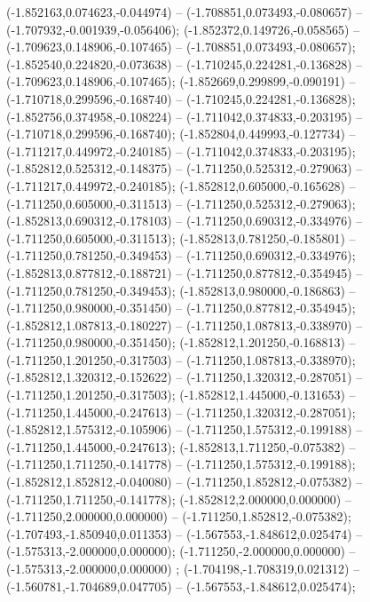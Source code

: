  (-1.852163,0.074623,-0.044974) -- (-1.708851,0.073493,-0.080657) -- (-1.707932,-0.001939,-0.056406);
 (-1.852372,0.149726,-0.058565) -- (-1.709623,0.148906,-0.107465) -- (-1.708851,0.073493,-0.080657);
 (-1.852540,0.224820,-0.073638) -- (-1.710245,0.224281,-0.136828) -- (-1.709623,0.148906,-0.107465);
 (-1.852669,0.299899,-0.090191) -- (-1.710718,0.299596,-0.168740) -- (-1.710245,0.224281,-0.136828);
 (-1.852756,0.374958,-0.108224) -- (-1.711042,0.374833,-0.203195) -- (-1.710718,0.299596,-0.168740);
 (-1.852804,0.449993,-0.127734) -- (-1.711217,0.449972,-0.240185) -- (-1.711042,0.374833,-0.203195);
 (-1.852812,0.525312,-0.148375) -- (-1.711250,0.525312,-0.279063) -- (-1.711217,0.449972,-0.240185);
 (-1.852812,0.605000,-0.165628) -- (-1.711250,0.605000,-0.311513) -- (-1.711250,0.525312,-0.279063);
 (-1.852813,0.690312,-0.178103) -- (-1.711250,0.690312,-0.334976) -- (-1.711250,0.605000,-0.311513);
 (-1.852813,0.781250,-0.185801) -- (-1.711250,0.781250,-0.349453) -- (-1.711250,0.690312,-0.334976);
 (-1.852813,0.877812,-0.188721) -- (-1.711250,0.877812,-0.354945) -- (-1.711250,0.781250,-0.349453);
 (-1.852813,0.980000,-0.186863) -- (-1.711250,0.980000,-0.351450) -- (-1.711250,0.877812,-0.354945);
 (-1.852812,1.087813,-0.180227) -- (-1.711250,1.087813,-0.338970) -- (-1.711250,0.980000,-0.351450);
 (-1.852812,1.201250,-0.168813) -- (-1.711250,1.201250,-0.317503) -- (-1.711250,1.087813,-0.338970);
 (-1.852812,1.320312,-0.152622) -- (-1.711250,1.320312,-0.287051) -- (-1.711250,1.201250,-0.317503);
 (-1.852812,1.445000,-0.131653) -- (-1.711250,1.445000,-0.247613) -- (-1.711250,1.320312,-0.287051);
 (-1.852812,1.575312,-0.105906) -- (-1.711250,1.575312,-0.199188) -- (-1.711250,1.445000,-0.247613);
 (-1.852813,1.711250,-0.075382) -- (-1.711250,1.711250,-0.141778) -- (-1.711250,1.575312,-0.199188);
 (-1.852812,1.852812,-0.040080) -- (-1.711250,1.852812,-0.075382) -- (-1.711250,1.711250,-0.141778);
 (-1.852812,2.000000,0.000000) -- (-1.711250,2.000000,0.000000) -- (-1.711250,1.852812,-0.075382);
 (-1.707493,-1.850940,0.011353) -- (-1.567553,-1.848612,0.025474) -- (-1.575313,-2.000000,0.000000);
 (-1.711250,-2.000000,0.000000) -- (-1.575313,-2.000000,0.000000) ;
 (-1.704198,-1.708319,0.021312) -- (-1.560781,-1.704689,0.047705) -- (-1.567553,-1.848612,0.025474);
